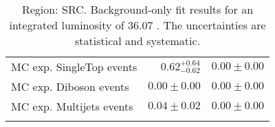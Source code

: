 \begin{table}
\begin{center}
{\begin{tabular*}{\textwidth}{@{\extracolsep{\fill}}lrr}
        MC exp. SingleTop events         & $0.62_{-0.62}^{+0.64}$          & $0.00 \pm 0.00$              \\
        MC exp. Diboson events         & $0.00 \pm 0.00$          & $0.00 \pm 0.00$              \\
        MC exp. Multijets events         & $0.04 \pm 0.02$          & $0.00 \pm 0.00$              \\
\noalign{\smallskip}\hline\noalign{\smallskip}
\end{tabular*}
}
\end{center}
\caption{Region: SRC. Background-only fit results for an integrated luminosity of 36.07 \ifb. The uncertainties are statistical and systematic.
}
\label{table.bkgonly.SRC4to5}
\end{table}
%
